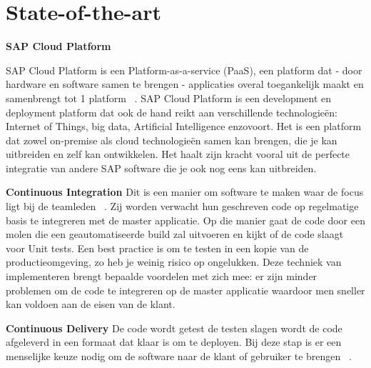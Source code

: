 
\section{State-of-the-art}
\label{sec:state-of-the-art}
\large{\textbf{SAP Cloud Platform}}

SAP Cloud Platform is een Platform-as-a-service (PaaS), een platform dat - door hardware en software samen te brengen - applicaties overal toegankelijk maakt en samenbrengt tot 1 platform  ~\autocite{SAPSE2018}.
SAP Cloud Platform is een development en deployment platform dat ook de hand reikt aan verschillende technologieën: Internet of Things, big data, Artificial Intelligence enzovoort. Het is een platform dat zowel on-premise als cloud technologieën samen kan brengen, die je kan uitbreiden en zelf kan ontwikkelen. Het haalt zijn kracht vooral uit de perfecte integratie van andere SAP software die je ook nog eens kan uitbreiden. 

\large{\textbf{Continuous Integration}}
Dit is een manier om software te maken waar de focus ligt bij de teamleden ~\autocite{Fowler2006}. Zij worden verwacht hun geschreven code op regelmatige basis te integreren met de master applicatie. Op die manier gaat de code door een molen die een geautomatiseerde build zal uitvoeren en kijkt of de code slaagt voor Unit tests. Een best practice is om te testen in een kopie van de productieomgeving, zo heb je weinig risico op ongelukken.
Deze techniek van implementeren brengt bepaalde voordelen met zich mee: er zijn minder problemen om de code te integreren op de master applicatie waardoor men sneller kan voldoen aan de eisen van de klant.

\large{\textbf{Continuous Delivery}}
De code wordt getest  de testen slagen wordt de code afgeleverd in een formaat dat klaar is om te deployen.
Bij deze stap is er een menselijke keuze nodig om de software naar de klant of gebruiker te brengen ~\autocite{Fowler2013}.


